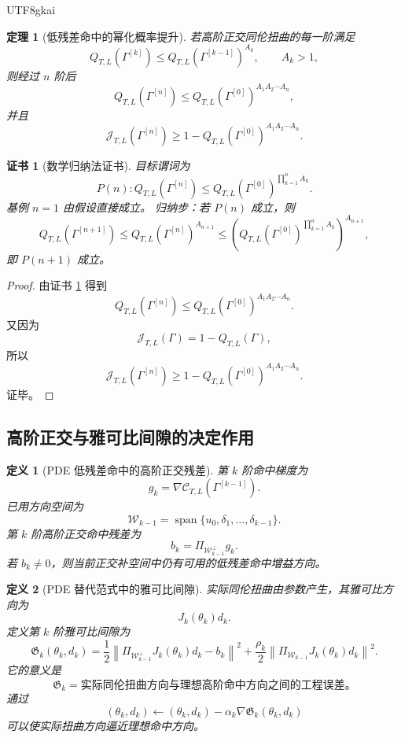 \documentclass[12pt]{article}
\newtheorem{definition}{定义}[section]
\newtheorem{theorem}{定理}[section]
\newtheorem{Certificate}{证书}[section]
\begin{document}
\begin{CJK*}{UTF8}{gkai}
\begin{theorem}[低残差命中的幂化概率提升]
\label{thm:tex55-pde-power-hit}
若高阶正交同伦扭曲的每一阶满足
\[
  Q_{T,L}(\Gamma^{[k]})
  \le
  Q_{T,L}(\Gamma^{[k-1]})^{A_k},
  \qquad
  A_k>1,
\]
则经过 \(n\) 阶后
\[
  Q_{T,L}(\Gamma^{[n]})
  \le
  Q_{T,L}(\Gamma^{[0]})^{A_1A_2\cdots A_n},
\]
并且
\[
  \mathcal J_{T,L}(\Gamma^{[n]})
  \ge
  1-
  Q_{T,L}(\Gamma^{[0]})^{A_1A_2\cdots A_n}.
\]
\end{theorem}

\begin{Certificate}[数学归纳法证书]
\label{cert:tex55-pde-power-hit}
目标谓词为
\[
  P(n):
  Q_{T,L}(\Gamma^{[n]})
  \le
  Q_{T,L}(\Gamma^{[0]})^{\prod_{k=1}^{n}A_k}.
\]
基例 \(n=1\) 由假设直接成立。
归纳步：若 \(P(n)\) 成立，则
\[
  Q_{T,L}(\Gamma^{[n+1]})
  \le
  Q_{T,L}(\Gamma^{[n]})^{A_{n+1}}
  \le
  \left(
  Q_{T,L}(\Gamma^{[0]})^{\prod_{k=1}^{n}A_k}
  \right)^{A_{n+1}},
\]
即 \(P(n+1)\) 成立。
\end{Certificate}

\begin{proof}
由证书 \ref{cert:tex55-pde-power-hit} 得到
\[
  Q_{T,L}(\Gamma^{[n]})
  \le
  Q_{T,L}(\Gamma^{[0]})^{A_1A_2\cdots A_n}.
\]
又因为
\[
  \mathcal J_{T,L}(\Gamma)=1-Q_{T,L}(\Gamma),
\]
所以
\[
  \mathcal J_{T,L}(\Gamma^{[n]})
  \ge
  1-
  Q_{T,L}(\Gamma^{[0]})^{A_1A_2\cdots A_n}.
\]
证毕。
\end{proof}

\subsection{高阶正交与雅可比间隙的决定作用}
\label{subsec:tex55-pde-orthogonal-jacobian}

\begin{definition}[PDE 低残差命中的高阶正交残差]
\label{def:tex55-pde-orthogonal-residual}
第 \(k\) 阶命中梯度为
\[
  g_k
  =
  \nabla\mathcal C_{T,L}(\Gamma^{[k-1]}).
\]
已用方向空间为
\[
  \mathcal W_{k-1}
  =
  \operatorname{span}\{u_0,\delta_1,\ldots,\delta_{k-1}\}.
\]
第 \(k\) 阶高阶正交命中残差为
\[
  b_k
  =
  \Pi_{\mathcal W_{k-1}^{\perp}}g_k.
\]
若 \(b_k\neq0\)，则当前正交补空间中仍有可用的低残差命中增益方向。
\end{definition}

\begin{definition}[PDE 替代范式中的雅可比间隙]
\label{def:tex55-pde-jacobian-gap}
实际同伦扭曲由参数产生，其雅可比方向为
\[
  J_k(\theta_k)d_k.
\]
定义第 \(k\) 阶雅可比间隙为
\[
  \mathfrak G_k(\theta_k,d_k)
  =
  \frac12
  \left\lVert
  \Pi_{\mathcal W_{k-1}^{\perp}}
  J_k(\theta_k)d_k
  -
  b_k
  \right\rVert^2
  +
  \frac{\rho_k}{2}
  \left\lVert
  \Pi_{\mathcal W_{k-1}}
  J_k(\theta_k)d_k
  \right\rVert^2.
\]
它的意义是
\[
  \boxed{
  \mathfrak G_k
  =
  \text{实际同伦扭曲方向与理想高阶命中方向之间的工程误差。}
  }
\]
通过
\[
  (\theta_k,d_k)
  \leftarrow
  (\theta_k,d_k)
  -
  \alpha_k
  \nabla\mathfrak G_k(\theta_k,d_k)
\]
可以使实际扭曲方向逼近理想命中方向。
\end{definition}


\end{CJK*}
\end{document}
